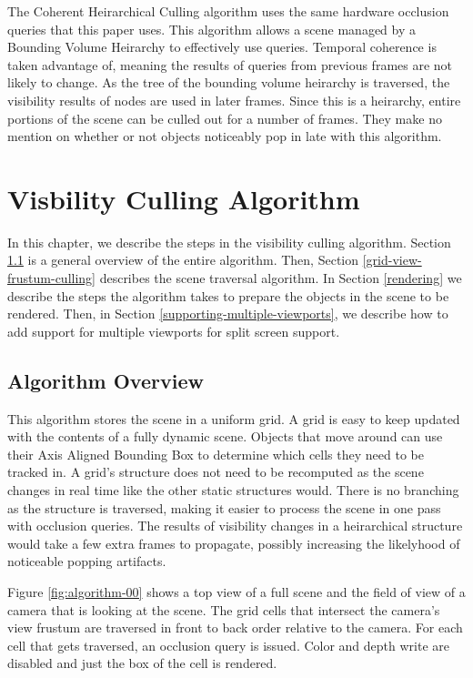 \documentclass[12pt]{ucthesis}
\begin{document}
The Coherent Heirarchical Culling algorithm uses the same hardware occlusion queries that this paper uses.\cite{CHC, CHCpp}
This algorithm allows a scene managed by a Bounding Volume Heirarchy to effectively use queries.
Temporal coherence is taken advantage of, meaning the results of queries from previous frames are not likely to change.
As the tree of the bounding volume heirarchy is traversed, the visibility results of nodes are used in later frames.
Since this is a heirarchy, entire portions of the scene can be culled out for a number of frames.
They make no mention on whether or not objects noticeably pop in late with this algorithm.

\chapter{Visbility Culling Algorithm}
\label{visibility-culling-algorithm}

In this chapter, we describe the steps in the visibility culling algorithm.
Section \ref{algorithm-overview} is a general overview of the entire algorithm.
Then, Section \ref{grid-view-frustum-culling} describes the scene traversal algorithm.
In Section \ref{rendering} we describe the steps the algorithm takes to prepare the objects in the scene to be rendered.
Then, in Section \ref{supporting-multiple-viewports}, we describe how to add support for multiple viewports for split screen support. 

\section{Algorithm Overview}
\label{algorithm-overview}

This algorithm stores the scene in a uniform grid.
A grid is easy to keep updated with the contents of a fully dynamic scene.
Objects that move around can use their Axis Aligned Bounding Box to determine which cells they need to be tracked in.
A grid's structure does not need to be recomputed as the scene changes in real time like the other static structures would.
There is no branching as the structure is traversed, making it easier to process the scene in one pass with occlusion queries.
The results of visibility changes in a heirarchical structure would take a few extra frames to propagate, possibly increasing the likelyhood of noticeable popping artifacts.

Figure \ref{fig:algorithm-00} shows a top view of a full scene and the field of view of a camera that is looking at the scene.
The grid cells that intersect the camera's view frustum are traversed in front to back order relative to the camera.
For each cell that gets traversed, an occlusion query is issued.
Color and depth write are disabled and just the box of the cell is rendered.
\end{document}
